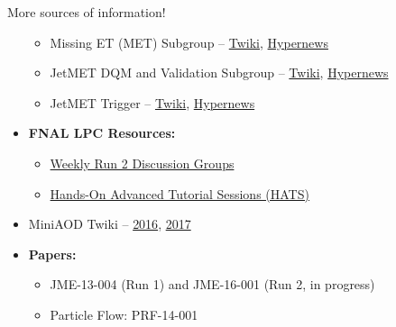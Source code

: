 \begin{frame}
\begin{block}{More sources of information!}
\begin{itemize}
\begin{itemize}
				\item Missing ET (MET) Subgroup -- \href{https://twiki.cern.ch/twiki/bin/view/CMS/MissingET}{Twiki}, \href{https://hypernews.cern.ch/HyperNews/CMS/get/met.html}{Hypernews} 
				\item JetMET DQM and Validation Subgroup -- \href{https://twiki.cern.ch/twiki/bin/view/CMS/JetMETDQMValRun2}{Twiki}, \href{https://hypernews.cern.ch/HyperNews/CMS/get/jetmet-dqm.html}{Hypernews} 
				\item JetMET Trigger -- \href{https://twiki.cern.ch/twiki/bin/viewauth/CMS/JetMETTriggers}{Twiki}, \href{https://hypernews.cern.ch/HyperNews/CMS/get/jetmet-trigger.html}{Hypernews} 
			\end{itemize}
			\item \textbf{FNAL LPC Resources:}
			\begin{itemize}
				\footnotesize
				\item \href{https://indico.cern.ch/category/7082/}{Weekly Run 2 Discussion Groups}
				\item \href{http://lpc.fnal.gov/programs/schools-workshops/hats.shtml}{Hands-On Advanced Tutorial Sessions (HATS)}
			\end{itemize}
			\item MiniAOD Twiki -- \href{https://twiki.cern.ch/twiki/bin/view/CMSPublic/WorkBookMiniAOD2016}{2016}, \href{https://twiki.cern.ch/twiki/bin/view/CMSPublic/WorkBookMiniAOD2017}{2017}
			\item \textbf{Papers:}
			\begin{itemize}
				\footnotesize
				\item JME-13-004 (Run 1) and JME-16-001 (Run 2, in progress)
				\item Particle Flow: PRF-14-001
			\end{itemize}
		\end{itemize}
	\end{block}
\end{frame}
